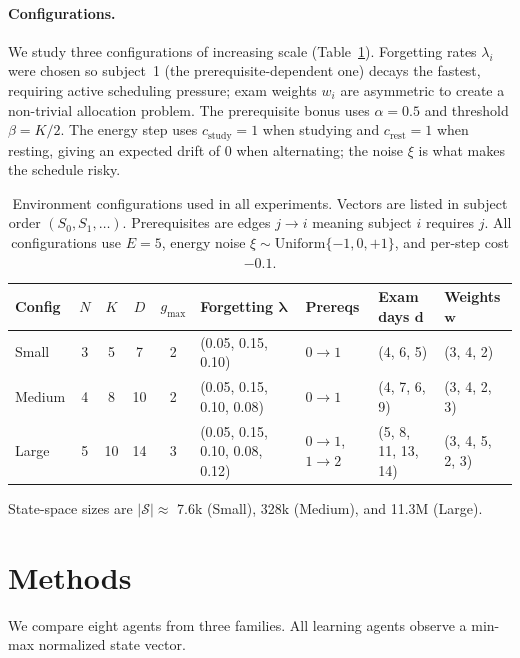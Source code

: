 \documentclass[a4paper,11pt]{article}
\theoremstyle{definition}
\begin{document}
\paragraph{Configurations.} We study three configurations of increasing scale (Table~\ref{tab:env_configs}). Forgetting rates $\lambda_i$ were chosen so subject~1 (the prerequisite-dependent one) decays the fastest, requiring active scheduling pressure; exam weights $w_i$ are asymmetric to create a non-trivial allocation problem. The prerequisite bonus uses $\alpha = 0.5$ and threshold $\beta = K/2$. The energy step uses $c_\text{study} = 1$ when studying and $c_\text{rest} = 1$ when resting, giving an expected drift of $0$ when alternating; the noise $\xi$ is what makes the schedule risky.

\begin{table}[H]
\centering
\caption{Environment configurations used in all experiments. Vectors are listed in subject order $(S_0, S_1, \ldots)$. Prerequisites are edges $j \to i$ meaning subject $i$ requires $j$. All configurations use $E = 5$, energy noise $\xi \sim \mathrm{Uniform}\{-1, 0, +1\}$, and per-step cost $-0.1$.}
\label{tab:env_configs}
\footnotesize
\setlength{\tabcolsep}{4pt}
\begin{tabular}{lccccllll}
\toprule
Config & $N$ & $K$ & $D$ & $g_{\max}$ & Forgetting $\boldsymbol{\lambda}$ & Prereqs & Exam days $\mathbf{d}$ & Weights $\mathbf{w}$ \\
\midrule
Small  & 3 & 5  & 7  & 2 & (0.05, 0.15, 0.10)                   & $0\!\to\!1$               & (4, 6, 5)         & (3, 4, 2) \\
Medium & 4 & 8  & 10 & 2 & (0.05, 0.15, 0.10, 0.08)             & $0\!\to\!1$               & (4, 7, 6, 9)      & (3, 4, 2, 3) \\
Large  & 5 & 10 & 14 & 3 & (0.05, 0.15, 0.10, 0.08, 0.12)       & $0\!\to\!1$, $1\!\to\!2$ & (5, 8, 11, 13, 14)& (3, 4, 5, 2, 3) \\
\bottomrule
\end{tabular}
\end{table}

State-space sizes are $|\mathcal{S}| \approx$ 7.6k (Small), 328k (Medium), and 11.3M (Large).

\section{Methods}
\label{sec:methods}

We compare eight agents from three families. All learning agents observe a min-max normalized state vector.
\end{document}
